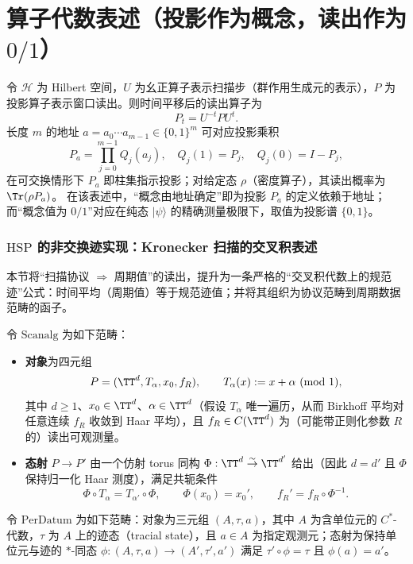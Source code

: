 \section{算子代数表述（投影作为概念，读出作为 \texorpdfstring{$0/1$}{0/1}）}
\label{app:op-algebra}

令 $\mathcal{H}$ 为 Hilbert 空间，$U$ 为幺正算子表示扫描步（群作用生成元的表示），$P$ 为投影算子表示窗口读出。则时间平移后的读出算子为
\[
P_t=U^{-t}PU^t.
\]
长度 $m$ 的地址 $a=a_0\cdots a_{m-1}\in\{0,1\}^m$ 可对应投影乘积
\[
P_a=\prod_{j=0}^{m-1} Q_{j}(a_j),\quad
Q_{j}(1)=P_j,\quad Q_{j}(0)=I-P_j,
\]
在可交换情形下 $P_a$ 即柱集指示投影；对给定态 $\rho$（密度算子），其读出概率为 $\Tr(\rho P_a)$。
在该表述中，“概念由地址确定”即为投影 $P_a$ 的定义依赖于地址；而“概念值为 $0/1$”对应在纯态 $\lvert\psi\rangle$ 的精确测量极限下，取值为投影谱 $\{0,1\}$。

\subsubsection{\texorpdfstring{$\mathrm{HSP}$}{HSP} 的非交换迹实现：Kronecker 扫描的交叉积表述}\label{app:op-algebra-hsp-trace}

本节将“扫描协议 \(\Rightarrow\) 周期值”的读出，提升为一条严格的“交叉积代数上的规范迹”公式：时间平均（周期值）等于规范迹值；并将其组织为协议范畴到周期数据范畴的函子。

\begin{definition}\label{def:scanalg}
令 \(\mathrm{Scanalg}\) 为如下范畴：
\begin{itemize}
  \item \textbf{对象}为四元组
  \[
  P=(\TT^d,T_\alpha,x_0,f_R),
  \qquad
  T_\alpha(x):=x+\alpha\ (\mathrm{mod}\ 1),
  \]
  其中 \(d\ge 1\)、\(x_0\in\TT^d\)、\(\alpha\in\TT^d\)（假设 \(T_\alpha\) 唯一遍历，从而 Birkhoff 平均对任意连续 \(f_R\) 收敛到 Haar 平均），且 \(f_R\in C(\TT^d)\) 为（可能带正则化参数 \(R\) 的）读出可观测量。
  \item \textbf{态射} \(P\to P'\) 由一个仿射 torus 同构 \(\Phi:\TT^d\overset{\sim}{\to}\TT^{d'}\) 给出（因此 \(d=d'\) 且 \(\Phi\) 保持归一化 Haar 测度），满足共轭条件
  \[
  \Phi\circ T_\alpha = T_{\alpha'}\circ \Phi,\qquad \Phi(x_0)=x_0',\qquad f_R'=f_R\circ \Phi^{-1}.
  \]
\end{itemize}
\end{definition}

\begin{definition}\label{def:perdatum}
令 \(\mathrm{PerDatum}\) 为如下范畴：对象为三元组 \((A,\tau,a)\)，其中 \(A\) 为含单位元的 \(C^\ast\)-代数，\(\tau\) 为 \(A\) 上的迹态（tracial state），且 \(a\in A\) 为指定观测元；态射为保持单位元与迹的 \(\ast\)-同态 \(\phi:(A,\tau,a)\to(A',\tau',a')\) 满足 \(\tau' \circ \phi=\tau\) 且 \(\phi(a)=a'\)。
\end{definition}


